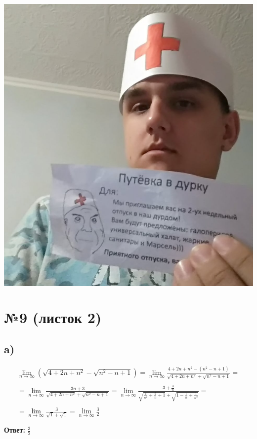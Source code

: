 \documentclass[a4paper,12pt]{article}
\begin{document}
\begin{center}
\includegraphics[scale=0.25]{durka}\\
\end{center}
\section*{№9 (листок 2)}
\subsection*{a) }
\begin{equation*}
\begin{gathered}
\lim_{n\to\infty} (\sqrt{4+2n+n^2} - \sqrt{n^2-n+1}) =
\lim_{n\to\infty} \frac{4+2n+n^2-(n^2-n+1)}{\sqrt{4+2n+n^2} + \sqrt{n^2-n+1}} = \\\\=
\lim_{n\to\infty} \frac{3n+3}{\sqrt{4+2n+n^2} + \sqrt{n^2-n+1}} =
\lim_{n\to\infty} \frac{3+\frac{3}{n}}{\sqrt{\frac{4}{n^2}+\frac{2}{n}+1} + \sqrt{1-\frac{1}{n} + \frac{1}{n^2}}} = \\\\ = 
\lim_{n\to\infty} \frac{3}{\sqrt{1} + \sqrt{1}} = \lim_{n\to\infty} \frac{3}{2}\\\\
\end{gathered} 
\end{equation*}
{\Large\textbf{Ответ:} $\frac{3}{2} $}
\end{document}
